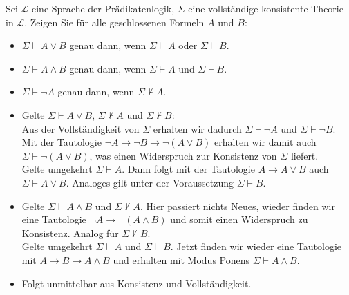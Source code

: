 
\begin{exercise}[113]

Sei $\mathscr{L}$ eine Sprache der Prädikatenlogik, $\Sigma$ eine vollständige
konsistente Theorie in $\mathscr{L}$. Zeigen Sie für alle geschlossenen Formeln
$A$ und $B$:
\begin{itemize}
  \item $\Sigma \vdash A \lor B$ genau dann, wenn $\Sigma \vdash A$ oder $\Sigma \vdash B$.
  \item $\Sigma \vdash A \land B$ genau dann, wenn $\Sigma \vdash A$ und $\Sigma \vdash B$.
  \item $\Sigma \vdash \neg A$ genau dann, wenn $\Sigma \nvdash A$.
\end{itemize}
\end{exercise}


\begin{solution}

\phantom{}
\begin{itemize}
  \item Gelte $\Sigma \vdash A \lor B$, $\Sigma \nvdash A$ und $\Sigma \nvdash B$:\\
  Aus der Vollständigkeit von $\Sigma$ erhalten wir dadurch $\Sigma \vdash \neg A$
  und $\Sigma \vdash \neg B$. Mit der Tautologie $\neg A \rightarrow \neg B \rightarrow \neg(A \lor B)$
  erhalten wir damit auch
  $\Sigma \vdash \neg(A \lor B)$, was einen Widerspruch zur Konsistenz von $\Sigma$ liefert. \\
  Gelte umgekehrt $\Sigma \vdash A$. Dann folgt mit der Tautologie $A \rightarrow A \lor B$
  auch $\Sigma \vdash A \lor B$. Analoges gilt unter der Voraussetzung $\Sigma \vdash B$.
  \item Gelte $\Sigma \vdash A \land B$ und $\Sigma \nvdash A$.
  Hier passiert nichts Neues, wieder finden wir eine Tautologie $\neg A \rightarrow \neg(A \land B)$
  und somit einen Widerspruch zu Konsistenz. Analog für $\Sigma \nvdash B$. \\
  Gelte umgekehrt $\Sigma \vdash A $ und $\Sigma \vdash B$. Jetzt finden wir wieder
  eine Tautologie mit $A \rightarrow B \rightarrow A \land B$ und erhalten mit
  Modus Ponens $\Sigma \vdash A \land B$.
  \item Folgt unmittelbar aus Konsistenz und Vollständigkeit.
\end{itemize}

\end{solution}

